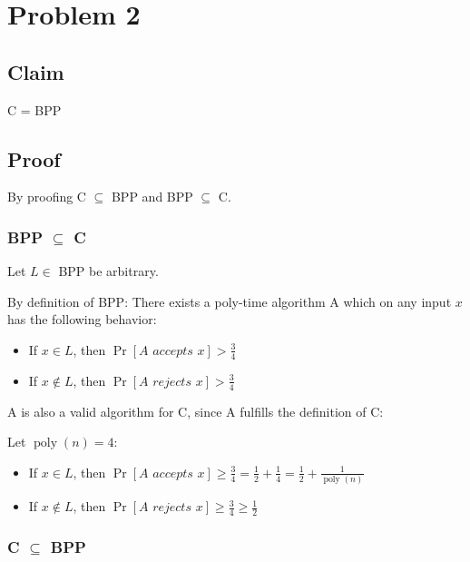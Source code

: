 \section*{Problem 2}

\subsection*{Claim}

C = BPP


\subsection*{Proof}

By proofing C $\subseteq$ BPP and BPP $\subseteq$ C.

\subsubsection*{BPP $\subseteq$ C}

Let $L \in$ BPP be arbitrary.

By definition of BPP: There exists a poly-time algorithm A which on any input $x$ has the following behavior:

\begin{itemize}
    \item If $x \in L$, then $\operatorname{Pr}[\textit{A accepts } x] > \frac{3}{4}$
    
    \item If $x \notin L$, then $\operatorname{Pr}[\textit{A rejects } x] > \frac{3}{4}$
\end{itemize}

A is also a valid algorithm for C, since A fulfills the definition of C:

Let $\operatorname{poly}(n) = 4$:

\begin{itemize}
    \item If $x \in L$, then $\operatorname{Pr}[\textit{A accepts } x] \geq \frac{3}{4} = \frac{1}{2} + \frac{1}{4} = \frac{1}{2} + \frac{1}{\operatorname{poly}(n)}$
    
    \item If $x \notin L$, then $\operatorname{Pr}[\textit{A rejects } x] \geq \frac{3}{4} \geq \frac{1}{2}$
\end{itemize}

\subsubsection*{C $\subseteq$ BPP}

